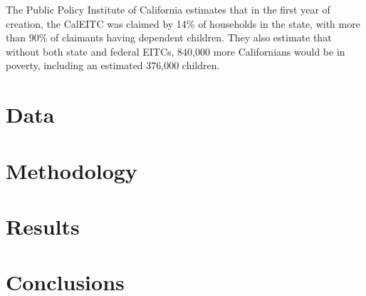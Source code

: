 \documentclass{article}
\begin{document}
The Public Policy Institute of California estimates that in the first year of creation, the CalEITC was claimed by 14\% of households in the state, with more than 90\% of claimants having dependent children. They also estimate that without both state and federal EITCs, 840,000 more Californians would be in poverty, including an estimated 376,000 children.  


\section{Data}


\section{Methodology}


\section{Results}



\section{Conclusions}

{}

\end{document}
